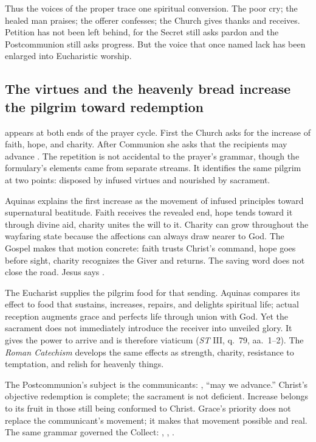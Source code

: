 Thus the voices of the proper trace one spiritual conversion. The poor cry;
the healed man praises; the offerer confesses; the Church gives thanks and
receives. Petition has not been left behind, for the Secret still asks pardon
and the Postcommunion still asks progress. But the voice that once named lack
has been enlarged into Eucharistic worship.

\subsection*{The virtues and the heavenly bread increase the pilgrim toward redemption\enspace
  }

 appears at both ends of the prayer cycle. First the Church
asks for the increase of faith, hope, and charity. After Communion she asks
that the recipients may advance .
The repetition is not accidental to the prayer's grammar, though the
formulary's elements came from separate streams. It identifies the same
pilgrim at two points: disposed by infused virtues and nourished by sacrament.

Aquinas explains the first increase as the movement of infused principles
toward supernatural beatitude. Faith receives the revealed end, hope tends
toward it through divine aid, charity unites the will to it. Charity can grow
throughout the wayfaring state because the affections can always draw nearer
to God. The Gospel makes that motion concrete: faith trusts Christ's command,
hope goes before sight, charity recognizes the Giver and returns. The saving
word does not close the road. Jesus says .

The Eucharist supplies the pilgrim food for that sending. Aquinas compares its
effect to food that sustains, increases, repairs, and delights spiritual life;
actual reception augments grace and perfects life through union with God. Yet
the sacrament does not immediately introduce the receiver into unveiled glory.
It gives the power to arrive and is therefore viaticum (\emph{ST} III,
q.~79, aa.~1--2). The \emph{Roman Catechism} develops the same effects as
strength, charity, resistance to temptation, and relish for heavenly things.

The Postcommunion's subject is the communicants: , ``may
we advance.'' Christ's objective redemption is complete; the sacrament is not
deficient. Increase belongs to its fruit in those still being conformed to
Christ. Grace's priority does not replace the communicant's movement; it makes
that movement possible and real. The same grammar governed the Collect:
, , .

